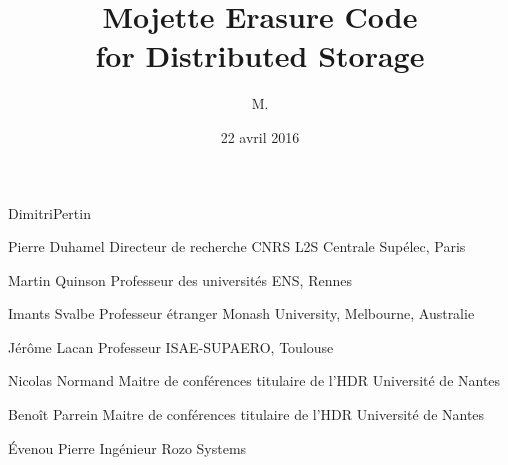 



\title{Mojette Erasure Code\\
    for Distributed Storage}



\author{M.}{Dimitri}{Pertin}






\thesisnumber{}

\date{22 avril 2016}

    {Pierre}
    {Duhamel}
    {Directeur de recherche CNRS}
    {L2S Centrale Supélec, Paris}

    {Martin}
    {Quinson}
    {Professeur des universités}
    {ENS, Rennes}

    {Imants}
    {Svalbe}
    {Professeur étranger}
    {Monash University, Melbourne, Australie}

    {Jérôme}
    {Lacan}
    {Professeur}
    {ISAE-SUPAERO, Toulouse}

    {Nicolas}
    {Normand}
    {Maitre de conférences titulaire de l'HDR}
    {Université de Nantes}
 
    {Benoît}
    {Parrein}
    {Maitre de conférences titulaire de l'HDR}
    {Université de Nantes}   

    {Évenou}
    {Pierre}
    {Ingénieur}
    {Rozo Systems}




